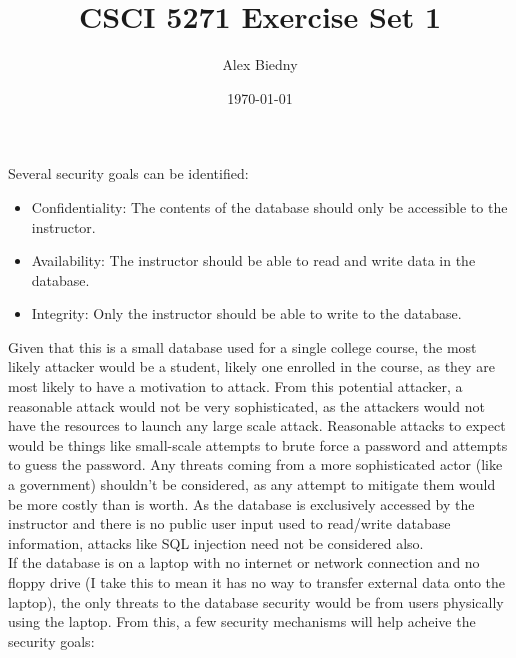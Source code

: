 \documentclass{jhwhw}
\title{CSCI 5271 Exercise Set 1}
\author{Alex Biedny}
\date{\today}
\begin{document}
\maketitle

Several security goals can be identified:
\begin{itemize}
\item Confidentiality: The contents of the database should only be accessible to the instructor.
\item Availability: The instructor should be able to read and write data in the database.
\item Integrity: Only the instructor should be able to write to the database.
\end{itemize}
Given that this is a small database used for a single college course, the most likely attacker would be a student, likely one enrolled in the course, as they are most likely to have a motivation to attack. From this potential attacker, a reasonable attack would not be very sophisticated, as the attackers would not have the resources to launch any large scale attack. Reasonable attacks to expect would be things like small-scale attempts to brute force a password and attempts to guess the password. Any threats coming from a more sophisticated actor (like a government) shouldn't be considered, as any attempt to mitigate them would be more costly than is worth. As the database is exclusively accessed by the instructor and there is no public user input used to read/write database information, attacks like SQL injection need not be considered also.
\\
If the database is on a laptop with no internet or network connection and no floppy drive (I take this to mean it has no way to transfer external data onto the laptop), the only threats to the database security would be from users physically using the laptop. From this, a few security mechanisms will help acheive the security goals:
\end{document}
